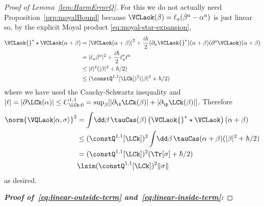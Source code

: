 \documentclass{article}
\numberwithin{equation}{section}
\begin{document}
\begin{proof}[Proof of Lemma~\ref{lem:HarmErrorQ}]
	
	For this we do not actually need Proposition~\ref{prp:moyalBound}
	because $\VCLaok(\beta) = \ell_a(\beta^a-\alpha^a)$ is just linear so, by the explicit Moyal product \eqref{eq:moyal-star-expansion},
	\begin{align}
		\VCLaok{}^*\star\VCLaok(\alpha+\beta) &= \left|\VCLaok(\alpha+\beta)\right|^2 + \frac{i\hbar}{2}(\partial_a\VCLaok{}^*)(\alpha+\beta)(\partial^a\VCLaok)(\alpha+\beta) \\
		&=  |\ell_a\beta^a|^2 + \frac{i\hbar}{2} \ell_a^* \ell^a      \\
		&\le |\ell|^2(|\beta|^2+\hbar/2)\\
		&\le (\constQ^{1,1}[\LCk])^2(|\beta|^2+\hbar/2)
	\end{align}
	where we have used the Cauchy-Schwartz inequality and $|\ell| = |\partial \LCk(\alpha)| \le C^{1,1}_{\LCk;0} = \sup_\beta [|\partial_\x \LCk(\beta)|+|\partial_\p \LCk(\beta)|]$.   Therefore
	\begin{align}
		\norm{\VQLaok|\alpha,\sigma \rangle }^2
		&= \int \!\dd \beta\, \tauCas(\beta)\left(\VCLaok{}^* \star \VCLaok\right)(\alpha+\beta)\\
		&\le (\constQ^{1,1}[\LCk])^2 \int \!\dd \beta\, \tauCas(\alpha+\beta)(|\beta|^2+\hbar/2)\\
		&= (\constQ^{1,1}[\LCk])^2 (\Tr[\sigma] + \hbar/2 )\\
		&\lsim (\constQ^{1,1}[\LCk])^2 \|\sigma\|
	\end{align}
	as desired.
	
	\noindent\textit{\textbf{Proof of~\eqref{eq:linear-outside-term}
			and~\eqref{eq:linear-inside-term}:}}
	

\end{proof}
\end{document}
